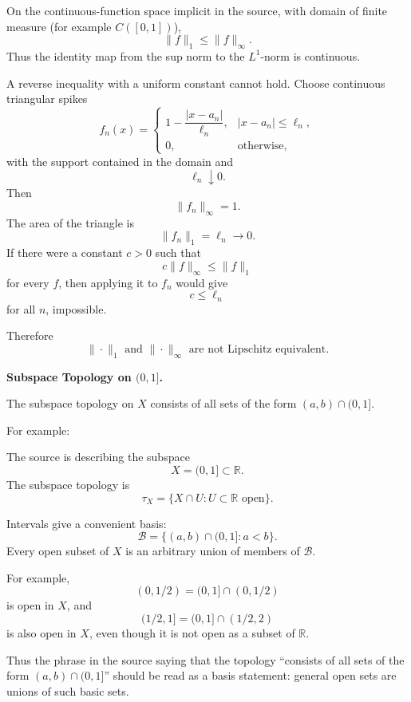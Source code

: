 \begin{solution}
On the continuous-function space implicit in the source, with domain of finite measure
(for example \(C([0,1])\)),
\[
\|f\|_1
\le
\|f\|_\infty.
\]
Thus the identity map from the sup norm to the \(L^1\)-norm is continuous.

A reverse inequality with a uniform constant cannot hold. Choose continuous triangular
spikes
\[
f_n(x)
=
\begin{cases}
1-\dfrac{|x-a_n|}{\ell_n},
&
|x-a_n|\le\ell_n,\\[2mm]
0,
&
\text{otherwise},
\end{cases}
\]
with the support contained in the domain and
\[
\ell_n\downarrow0.
\]
Then
\[
\|f_n\|_\infty=1.
\]
The area of the triangle is
\[
\|f_n\|_1
=
\ell_n\to0.
\]
If there were a constant \(c>0\) such that
\[
c\|f\|_\infty\le\|f\|_1
\]
for every \(f\), then applying it to \(f_n\) would give
\[
c\le\ell_n
\]
for all \(n\), impossible.

Therefore
\[
\boxed{
\|\cdot\|_1
\text{ and }
\|\cdot\|_\infty
\text{ are not Lipschitz equivalent}.
}
\]
\end{solution}


\begin{problem}[CP-II-0176]
\label{prob:cp-ii-0176}
\textbf{Subspace Topology on \((0,1]\).}

\hspace*{1.5em}The subspace topology on \(X\) consists of all sets of the form \((a,b)\cap(0,1]\).

	For example:
\end{problem}

\begin{solution}
The source is describing the subspace
\[
X=(0,1]
\subset\mathbb R.
\]
The subspace topology is
\[
\tau_X
=
\{X\cap U:U\subset\mathbb R\text{ open}\}.
\]

Intervals give a convenient basis:
\[
\boxed{
\mathcal B
=
\{(a,b)\cap(0,1]:a<b\}.
}
\]
Every open subset of \(X\) is an arbitrary union of members of \(\mathcal B\).

For example,
\[
(0,1/2)
=
(0,1]\cap(0,1/2)
\]
is open in \(X\), and
\[
(1/2,1]
=
(0,1]\cap(1/2,2)
\]
is also open in \(X\), even though it is not open as a subset of \(\mathbb R\).

Thus the phrase in the source saying that the topology ``consists of all sets of the form
\((a,b)\cap(0,1]\)'' should be read as a basis statement: general open sets are unions of
such basic sets.
\end{solution}


